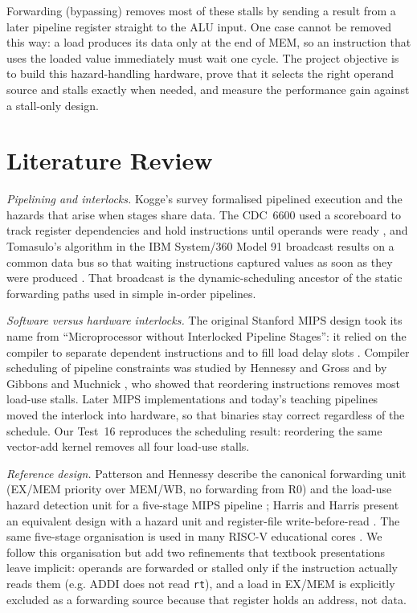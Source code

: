 \documentclass[conference]{IEEEtran}
\begin{document}
Forwarding (bypassing) removes most of these stalls by sending a result from a later pipeline register straight to the ALU input. One case cannot be removed this way: a load produces its data only at the end of MEM, so an instruction that uses the loaded value immediately must wait one cycle. The project objective is to build this hazard-handling hardware, prove that it selects the right operand source and stalls exactly when needed, and measure the performance gain against a stall-only design.

\section{Literature Review}
\textit{Pipelining and interlocks.} Kogge's survey \cite{kogge1981} formalised pipelined execution and the hazards that arise when stages share data. The CDC~6600 used a scoreboard to track register dependencies and hold instructions until operands were ready \cite{thornton1964}, and Tomasulo's algorithm in the IBM System/360 Model 91 broadcast results on a common data bus so that waiting instructions captured values as soon as they were produced \cite{tomasulo1967}. That broadcast is the dynamic-scheduling ancestor of the static forwarding paths used in simple in-order pipelines.

\textit{Software versus hardware interlocks.} The original Stanford MIPS design took its name from ``Microprocessor without Interlocked Pipeline Stages'': it relied on the compiler to separate dependent instructions and to fill load delay slots \cite{hennessy1982}. Compiler scheduling of pipeline constraints was studied by Hennessy and Gross \cite{hennessy1983} and by Gibbons and Muchnick \cite{gibbons1986}, who showed that reordering instructions removes most load-use stalls. Later MIPS implementations and today's teaching pipelines moved the interlock into hardware, so that binaries stay correct regardless of the schedule. Our Test~16 reproduces the scheduling result: reordering the same vector-add kernel removes all four load-use stalls.

\textit{Reference design.} Patterson and Hennessy describe the canonical forwarding unit (EX/MEM priority over MEM/WB, no forwarding from R0) and the load-use hazard detection unit for a five-stage MIPS pipeline \cite{patterson2013}; Harris and Harris present an equivalent design with a hazard unit and register-file write-before-read \cite{harris2012}. The same five-stage organisation is used in many RISC-V educational cores \cite{riscv2019}. We follow this organisation but add two refinements that textbook presentations leave implicit: operands are forwarded or stalled only if the instruction actually reads them (e.g. ADDI does not read \texttt{rt}), and a load in EX/MEM is explicitly excluded as a forwarding source because that register holds an address, not data.
\end{document}
